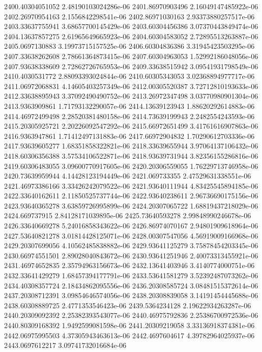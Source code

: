 {2400.40304051052 2.48190103024286e-06
2401.86970903496 2.16049147485922e-06
2402.26970954163 2.1556842298541e-06
2402.86971030163 2.93373880257517e-06
2403.33637755941 3.68657700145429e-06
2403.60304456386 3.07370443849474e-06
2404.13637857275 2.61965649665923e-06
2404.60304583052 2.72895513263887e-06
2405.0697130883 3.19973715157525e-06
2406.60304836386 3.31945423503295e-06
2407.33638262608 2.78661364873415e-06
2407.60304963053 1.52992186048056e-06
2407.93638338609 2.72862726765953e-06
2409.33638515942 3.09541931798549e-06
2410.4030531772 2.88093393024844e-06
2410.60305343053 3.02368894977717e-06
2411.06972068831 4.14605403257349e-06
2412.00305520387 3.72712810193633e-06
2412.33638895943 3.37092490490752e-06
2413.26972347498 3.03770980901304e-06
2413.9363909861 1.71793132290057e-06
2414.13639123943 1.88620292614883e-06
2414.46972499498 2.28520381480158e-06
2414.73639199943 2.2482554243593e-06
2415.20305925721 2.20226092547292e-06
2415.66972651499 3.41761616907863e-06
2416.9363947861 1.71412497131883e-06
2417.66972904832 1.70290612703336e-06
2417.93639605277 1.68351858322821e-06
2418.33639655944 3.97064137106432e-06
2418.60306356388 3.57534106522871e-06
2418.93639731944 3.82356155286816e-06
2419.60306483055 3.09600770917605e-06
2420.20306559055 1.76229713746958e-06
2420.73639959944 4.14428123194449e-06
2421.069733355 2.47529631338551e-06
2421.46973386166 3.33426242079522e-06
2421.93640111944 4.83425545894185e-06
2422.33640162611 2.11850525737744e-06
2422.93640238611 2.96736690175156e-06
2423.93640365278 3.63859726995899e-06
2424.20307065722 1.68819437218029e-06
2424.669737915 2.84128171039895e-06
2425.73640593278 2.99848990246678e-06
2426.33640669278 5.24016858343622e-06
2426.86974070167 2.94801909618964e-06
2427.53640821278 3.01814428125071e-06
2428.00307547056 4.56919009166968e-06
2429.20307699056 4.10562485838882e-06
2429.93641125279 3.75878454203345e-06
2430.66974551501 2.89028040843672e-06
2430.93641251946 2.40073313455921e-06
2431.46974652835 2.35794963156673e-06
2432.13641403946 3.4140774000751e-06
2432.33641429279 1.68457394177791e-06
2433.53641581279 3.52392487073262e-06
2434.40308357724 2.18434862095556e-06
2436.20308585724 3.08481515372614e-06
2437.20308712391 3.09854646574056e-06
2438.20308839058 3.14191454445688e-06
2438.60308889725 2.4771353546423e-06
2439.5364234128 2.19622934263287e-06
2440.20309092392 2.25382393543077e-06
2440.46975792836 2.25386700972536e-06
2440.80309168392 1.9492599081598e-06
2441.20309219058 3.33136918374381e-06
2442.06975995503 4.37305943463613e-06
2442.4697604617 4.39782964025937e-06
2443.0697612217 3.09741732016684e-06
}
